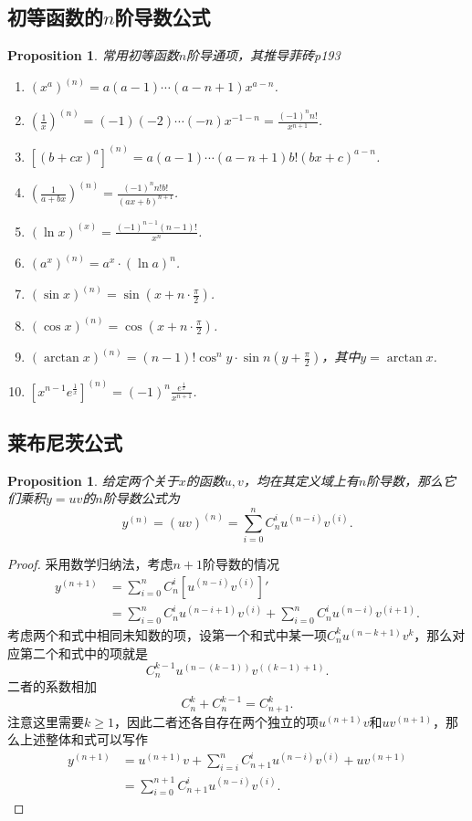 \documentclass{article}
\newtheorem{proposition}[theorem]{Proposition}
\begin{document}
\newpage
\subsection{初等函数的$n$阶导数公式}

\begin{proposition} \rm 常用初等函数$n$阶导通项，{\color{blue}其推导菲砖p193}
\begin{enumerate} 
	\item $(x^a)^{(n)} = a(a-1)\cdots(a-n+1)x^{a-n}$.
	\item $\left(\frac{1}{x}\right)^{(n)} = (-1)(-2)\cdots(-n)x^{-1-n} = \frac{(-1)^n n!}{x^{n+1}}$.
	\item $\left[(b+cx)^a\right]^{(n)} = a(a-1)\cdots(a-n+1)b!(bx+c)^{a-n}$.
	\item $\left(\frac{1}{a+bx}\right)^{(n)} = \frac{(-1)^n n!b!}{(ax+b)^{n+1}}$.
	\item $(\ln x)^{(x)} = \frac{(-1)^{n-1}(n-1)!}{x^n}$.
	\item $(a^x)^{(n)} = a^x\cdot (\ln a)^n$.
	\item $(\sin x)^{(n)} = \sin (x+n\cdot\frac{\pi}{2})$.
	\item $(\cos x)^{(n)} = \cos (x+n\cdot\frac{\pi}{2})$.
	\item $(\arctan x)^{(n)} = (n-1)!\cos^n y\cdot\sin n(y+\frac{\pi}{2})$，其中$y = \arctan x$.
	\item $\left[ x^{n-1}e^\frac{1}{x}\right]^{(n)} = (-1)^n \frac{e^\frac{1}{x}}{x^{n+1}}$.
\end{enumerate}
\end{proposition}

\newpage
\subsection{莱布尼茨公式}

\begin{proposition}
\rm 给定两个关于$x$的函数$u,v$，均在其定义域上有$n$阶导数，那么它们乘积$y=uv$的$n$阶导数公式为
$$
y^{(n)} =(uv)^{(n)} = \sum\limits_{i=0}^n C^i_n u^{(n-i)}v^{(i)}.
$$
\end{proposition}

\begin{proof}
采用数学归纳法，考虑$n+1$阶导数的情况
$$
\begin{array}{ll}
y^{(n+1)} &= \sum\limits_{i=0}^n C^i_n \left[u^{(n-i)}v^{(i)}\right]' \\
	&= \sum\limits_{i=0}^n C^i_n u^{(n-i+1)}v^{(i)} + \sum\limits_{i=0}^n C^i_n u^{(n-i)}v^{(i+1)}.
\end{array} 
$$
考虑两个和式中相同未知数的项，设第一个和式中某一项$C^k_n u^{(n-k+1)}v^{k}$，那么对应第二个和式中的项就是
$$
C^{k-1}_n u^{(n-(k-1))}v^{((k-1)+1)}.
$$
二者的系数相加
$$
C^k_n + C^{k-1}_n = C^k_{n+1}.
$$
注意这里需要$k\geq 1$，因此二者还各自存在两个独立的项$u^{(n+1)}v$和$uv^{(n+1)}$，那么上述整体和式可以写作
$$
\begin{array}{ll}
y^{(n+1)} &= u^{(n+1)}v + \sum\limits_{i=i}^{n} C^i_{n+1} u^{(n-i)}v^{(i)} + uv^{(n+1)} \\
& = \sum\limits_{i=0}^{n+1} C^i_{n+1} u^{(n-i)}v^{(i)}.
\end{array}
$$
\end{proof}
\end{document}
